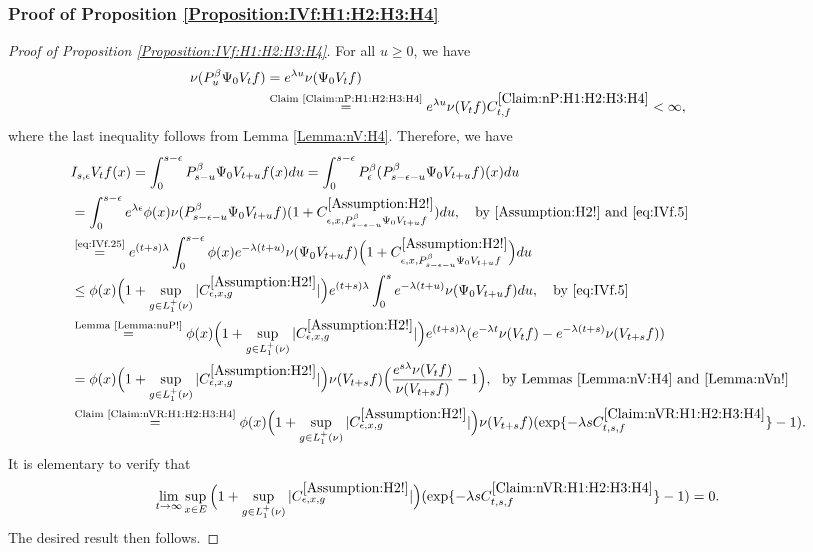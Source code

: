\documentclass[12pt,a4paper]{amsart}
\numberwithin{equation}{section}
\theoremstyle{plain}
\theoremstyle{definition}
\theoremstyle{remark}
\newcounter{N}
\newcounter{n}[N]
\begin{document}
\subsubsection{Proof of Proposition \ref{Proposition:IVf:H1:H2:H3:H4}}
\label{sec:IVf}
\begin{proof}[Proof of Proposition \ref{Proposition:IVf:H1:H2:H3:H4}]
For all $u\geq 0$, we have
\begin{align}
\label{eq:IVf.25} \nu(P_u^\beta \Psi_0 V_t f)
&= e^{\lambda u}\nu(\Psi_0 V_t f)
\\&\overset{\text{Claim \ref{Claim:nP:H1:H2:H3:H4}}}=e^{\lambda u}\nu(V_tf) C^{\ref{Claim:nP:H1:H2:H3:H4}}_{t,f}
< \infty, \label{eq:IVf.5}
\end{align}
where the last inequality follows from Lemma \ref{Lemma:nV:H4}. Therefore, we have
\begin{align}
 & I_{s,\epsilon} V_t f(x)
 = \int_0^{s- \epsilon} P_{s-u}^\beta \Psi_0 V_{t+u} f (x) du
 = \int_0^{s- \epsilon} P_\epsilon^\beta (P_{s - \epsilon - u}^\beta \Psi_0 V_{t+u} f )(x) du
 \\&= \int_0^{s - \epsilon} e^{\lambda \epsilon} \phi(x) \nu(P_{s - \epsilon - u}^{\beta} \Psi_0 V_{t+u} f)  (1+C^{\ref{Assumption:H2!}}_{\epsilon ,x , P_{s - \epsilon - u}^{\beta} \Psi_0 V_{t+u} f}) du ,\quad\text{by \ref{Assumption:H2!} and \eqref{eq:IVf.5}}
  \\&\overset{\text{\eqref{eq:IVf.25}}}= e^{(t+s)\lambda} \int_0^{s - \epsilon} \phi(x) e^{-\lambda (t+u)}\nu(\Psi_0 V_{t+u} f)  \Big(1+C^{\ref{Assumption:H2!}}_{\epsilon ,x , P_{s - \epsilon - u}^{\beta} \Psi_0 V_{t+u} f}\Big) du
 \\&\leq \phi(x) \Big(1+\sup_{g\in L_1^+(\nu)}|C^{\ref{Assumption:H2!}}_{\epsilon ,x , g}|\Big) e^{(t+s)\lambda} \int_0^{s} e^{-\lambda (t+u)} \nu(\Psi_0 V_{t+u}f)du,\quad\text{by \eqref{eq:IVf.5}}
 \\&\overset{\text{Lemma \ref{Lemma:nuP!}}}= \phi(x) \Big(1+\sup_{g\in L_1^+(\nu)}|C^{\ref{Assumption:H2!}}_{\epsilon ,x , g}|\Big)  e^{(t+s)\lambda} (e^{-\lambda t}\nu(V_tf)- e^{-\lambda(t+s)}\nu(V_{t+s}f))
 \\&= \phi(x) \Big(1+\sup_{g\in L_1^+(\nu)}|C^{\ref{Assumption:H2!}}_{\epsilon ,x , g}|\Big) \nu(V_{t+s}f) \Big( \frac{e^{s \lambda }\nu(V_tf)}{\nu(V_{t+s}f)} - 1\Big),\text{\  \ by Lemmas \ref{Lemma:nV:H4} and \ref{Lemma:nVn!}}
 \\&\overset{\text{Claim \ref{Claim:nVR:H1:H2:H3:H4}}}= \phi(x) \Big(1+\sup_{g\in L_1^+(\nu)}|C^{\ref{Assumption:H2!}}_{\epsilon ,x , g}|\Big) \nu(V_{t+s}f) ( \exp\{- \lambda s C^{\ref{Claim:nVR:H1:H2:H3:H4}}_{t,s,f}\} - 1).
 \end{align}
 It is elementary to verify that
\[\lim_{t\to \infty}\sup_{x\in E}\Big(1+\sup_{g\in L_1^+(\nu)}|C^{\ref{Assumption:H2!}}_{\epsilon ,x , g}|\Big)( \exp\{- \lambda s C^{\ref{Claim:nVR:H1:H2:H3:H4}}_{t,s,f}\} - 1)  = 0. \]
The desired result then follows.
\end{proof}
\end{document}
